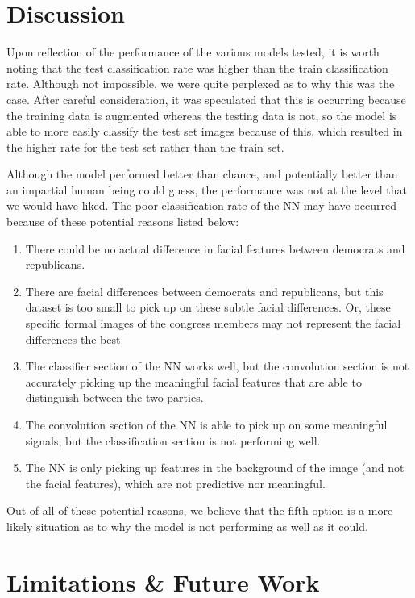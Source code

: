 \documentclass[manuscript,screen,review]{acmart}
\begin{document}
\section{Discussion}

Upon reflection of the performance of the various models tested, it is worth noting that the test classification rate was higher than the train classification rate. Although not impossible, we were quite perplexed as to why this was the case. After careful consideration, it was speculated that this is occurring because the training data is augmented whereas the testing data is not, so the model is able to more easily classify the test set images because of this, which resulted in the higher rate for the test set rather than the train set.
\par
Although the model performed better than chance, and potentially better than an impartial human being could guess, the performance was not at the level that we would have liked. The poor classification rate of the NN may have occurred because of these potential reasons listed below:

\begin{enumerate}
\item There could be no actual difference in facial features between democrats and republicans. 
\item There are facial differences between democrats and republicans, but this dataset is too small to pick up on these subtle facial differences. Or, these specific formal images of the congress members may not represent the facial differences the best
\item The classifier section of the NN works well, but the convolution section is not accurately picking up the meaningful facial features that are able to distinguish between the two parties. 
\item The convolution section of the NN is able to pick up on some meaningful signals, but the classification section is not performing well. 
\item The NN is only picking up features in the background of the image (and not the facial features), which are not predictive nor meaningful. 
\end{enumerate}

Out of all of these potential reasons, we believe that the fifth option is a more likely situation as to why the model is not performing as well as it could.


\section{Limitations \& Future Work}
\end{document}
